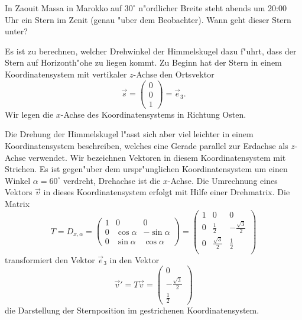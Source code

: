 In Zaouit Massa in Marokko auf $30^\circ$ n"ordlicher Breite steht abends
um 20:00 Uhr ein Stern im Zenit (genau "uber dem Beobachter). Wann geht
dieser Stern unter?

\begin{loesung}
Es ist zu berechnen, welcher Drehwinkel der Himmelskugel dazu f"uhrt,
dass der Stern auf Horizonth"ohe zu liegen kommt. Zu Beginn hat der
Stern in einem Koordinatensystem mit vertikaler $z$-Achse den
Ortsvektor
\[
\vec s=\begin{pmatrix}0\\0\\1\end{pmatrix}=\vec e_3.
\]
Wir legen die $x$-Achse des Koordinatensystems in Richtung Osten.

Die Drehung der Himmelskugel l"asst sich aber viel leichter in einem
Koordinatensystem beschreiben, welches eine Gerade parallel zur Erdachse
als $z$-Achse verwendet. Wir bezeichnen Vektoren in diesem Koordinatensystem
mit Strichen. Es ist gegen"uber dem urspr"unglichen Koordinatensystem
um einen Winkel $\alpha=60^\circ$ verdreht, Drehachse ist die $x$-Achse.
Die Umrechnung eines Vektors $\vec v$ in dieses Koordinatensystem
erfolgt mit Hilfe einer Drehmatrix.
Die Matrix
\[
T=D_{x,\alpha}=\begin{pmatrix}
1&          0&          0\\
0& \cos\alpha&-\sin\alpha\\
0& \sin\alpha& \cos\alpha
\end{pmatrix}
=
\begin{pmatrix}
1& 0&0\\
0&\frac12&-\frac{\sqrt{3}}2\\
0&\frac{\sqrt{3}}2&\frac12\\
\end{pmatrix}
\]
transformiert den Vektor $\vec e_3$ in den Vektor
\[
\vec v'=T\vec v=
\begin{pmatrix}
0\\-\frac{\sqrt{3}}2\\\frac12 
\end{pmatrix}
\]
die Darstellung der Sternposition im gestrichenen Koordinatensystem.


\end{loesung}
